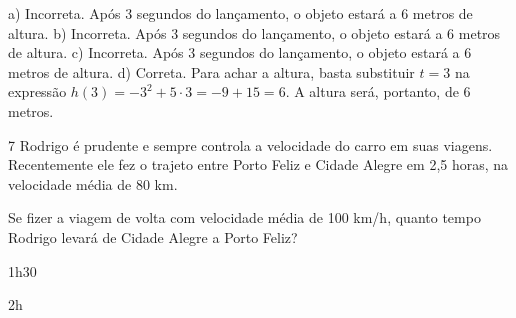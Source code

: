 \begin{escolha}
\begin{boxmedio}
\begin{boxmedio}
{\begin{boxpeq}
\begin{boxpeq}
{\begin{boxpeq}
\begin{boxmedio}
\begin{boxmedio}
\begin{boxpeq}
\begin{boxmedio}
\begin{boxpeq}
\begin{boxpeq}
\begin{boxpeq}
\begin{boxpeq}
\begin{boxmedio}
{\begin{boxmedio}
\begin{boxmedio}
\begin{boxpeq}
\begin{boxmedio}
\begin{boxpeq}
\begin{boxpeq}
\begin{boxpeq}
\begin{escolha}
{\begin{boxmedio}
\begin{boxpeq}
\begin{boxpeq}
\begin{boxpeq}
\begin{boxpeq}
\begin{boxpeq}
\begin{boxmedio}
\begin{boxpeq}
\begin{boxpeq}
\begin{boxpeq}
{\begin{boxpeq}
\begin{boxmedio}
\begin{boxpeq}
\begin{boxpeq}
\begin{boxpeq}
{\begin{boxpeq}
\begin{boxmedio}
{\begin{boxpeq}
\begin{boxpeq}
\begin{boxmedio}
\begin{boxmedio}
\begin{boxpeq}
\begin{boxpeq}
{\begin{boxpeq}
\begin{boxpeq}
\begin{boxpeq}
\begin{boxpeq}
\begin{boxpeq}
\begin{escolha}
\begin{escolha}
{\begin{boxmedio}
\begin{boxpeq}
\begin{q°}
\begin{boxmedio}
\begin{boxpeq}
\begin{boxpeq}
\begin{boxmedio}
\begin{boxmedio}
\begin{boxmedio}
\begin{boxmedio}
{\begin{enumerate}
\begin{boxpeq}
{\begin{boxpeq}
\begin{boxpeq}
\begin{boxmedio}
\begin{boxpeq}
\begin{boxpeq}
\begin{boxpeq}
\begin{escolha}
\begin{escolha}
{a) Incorreta. Após 3 segundos do lançamento, o objeto estará a 6 metros de altura.
b) Incorreta. Após 3 segundos do lançamento, o objeto estará a 6 metros de altura.
c) Incorreta. Após 3 segundos do lançamento, o objeto estará a 6 metros de altura.
d) Correta. Para achar a altura, basta substituir $t = 3$ na expressão 
$h(3) = - 3^2 + 5 \cdot 3 = - 9 + 15 = 6$. A altura será, portanto, de 6 metros.}

\num{7} Rodrigo é prudente e sempre controla a velocidade do carro em suas
viagens. Recentemente ele fez o trajeto entre Porto Feliz e Cidade Alegre em 
2,5 horas, na  velocidade média de 80 km.

Se fizer a viagem de volta com velocidade média de 100 km/h, quanto tempo 
Rodrigo levará de Cidade Alegre a Porto Feliz?  

\begin{escolha}

  \item 1h30

  \item 2h 
  

\end{escolha}
\end{escolha}
\end{escolha}
\end{boxpeq}
\end{boxpeq}
\end{boxpeq}
\end{boxmedio}
\end{boxpeq}
\end{boxpeq}}
\end{boxpeq}
\end{enumerate}}
\end{boxmedio}
\end{boxmedio}
\end{boxmedio}
\end{boxmedio}
\end{boxpeq}
\end{boxpeq}
\end{boxmedio}
\end{q°}
\end{boxpeq}
\end{boxmedio}}
\end{escolha}
\end{escolha}
\end{boxpeq}
\end{boxpeq}
\end{boxpeq}
\end{boxpeq}
\end{boxpeq}}
\end{boxpeq}
\end{boxpeq}
\end{boxmedio}
\end{boxmedio}
\end{boxpeq}
\end{boxpeq}}
\end{boxmedio}
\end{boxpeq}}
\end{boxpeq}
\end{boxpeq}
\end{boxpeq}
\end{boxmedio}
\end{boxpeq}}
\end{boxpeq}
\end{boxpeq}
\end{boxpeq}
\end{boxmedio}
\end{boxpeq}
\end{boxpeq}
\end{boxpeq}
\end{boxpeq}
\end{boxpeq}
\end{boxmedio}}
\end{escolha}
\end{boxpeq}
\end{boxpeq}
\end{boxpeq}
\end{boxmedio}
\end{boxpeq}
\end{boxmedio}
\end{boxmedio}}
\end{boxmedio}
\end{boxpeq}
\end{boxpeq}
\end{boxpeq}
\end{boxpeq}
\end{boxmedio}
\end{boxpeq}
\end{boxmedio}
\end{boxmedio}
\end{boxpeq}}
\end{boxpeq}
\end{boxpeq}}
\end{boxmedio}
\end{boxmedio}
\end{escolha}
